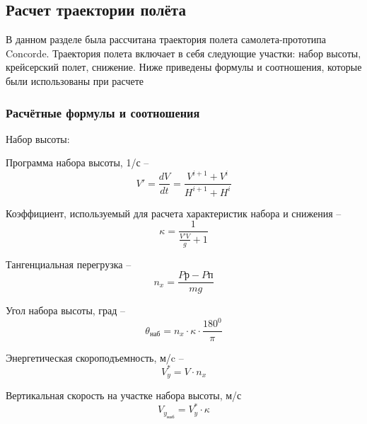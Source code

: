 \subsection{Расчет траектории полёта}
\pagestyle{fancy}
\fancyhf{}
\rfoot{\thepage}


В данном разделе была рассчитана траектория полета самолета-прототипа
Concorde. Траектория полета включает в себя следующие участки: набор высоты,
крейсерский полет, снижение. Ниже приведены формулы и соотношения,
которые были использованы при расчете

\subsubsection{Расчётные формулы и соотношения}
\label{sec:Расчётные формулы и соотношения}

\begin{center}
    Набор высоты:
\end{center}

Программа набора высоты, 1/с -- 
\begin{equation}
\label{eq:Программа набора}
    V' = \frac{dV}{dt} = \frac{V^{i+1}+V^{i}}{H^{i+1}+H^{i}}
\end{equation}

Коэффициент, используемый для расчета характеристик набора и снижения --  
\begin{equation}
    \label{eq:Коэффициент}
    \kappa = \frac{1}{\frac{V'V}{g}+1}
\end{equation}

Тангенциальная перегрузка --  
\begin{equation}
    \label{eq:Тангенциальная перегрузка }
    n_x = \frac{P\text{р}-P\text{п}}{mg}
\end{equation}

Угол набора высоты, град -- 
\begin{equation}
    \label{eq:Угол набора высоты}
    \theta_\text{наб} = n_x \cdot \kappa \cdot \frac{180^0}{\pi}
\end{equation}

Энергетическая скороподъемность, м/c -- 
\begin{equation}
    \label{eq:Энергетическая скороподъемность}
    V_y^* = V \cdot n_x
\end{equation}

Вертикальная скорость на участке набора высоты, м/с
\begin{equation}
    \label{eq:Вертикальная скорость на участке набора высоты}
    V_{y_\text{наб}} = V_y^* \cdot \kappa
\end{equation}

